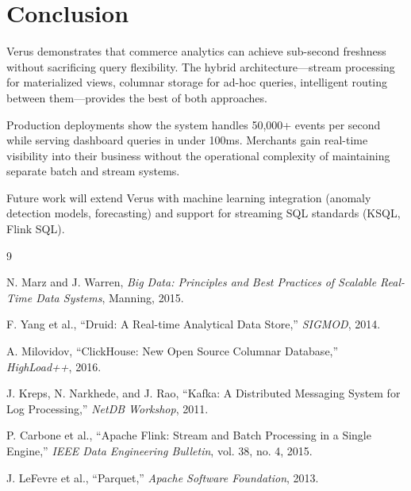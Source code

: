 \section{Conclusion}


Verus demonstrates that commerce analytics can achieve sub-second freshness without sacrificing query flexibility. The hybrid architecture—stream processing for materialized views, columnar storage for ad-hoc queries, intelligent routing between them—provides the best of both approaches.

Production deployments show the system handles 50,000+ events per second while serving dashboard queries in under 100ms. Merchants gain real-time visibility into their business without the operational complexity of maintaining separate batch and stream systems.

Future work will extend Verus with machine learning integration (anomaly detection models, forecasting) and support for streaming SQL standards (KSQL, Flink SQL).

\begin{thebibliography}{9}

N. Marz and J. Warren, \textit{Big Data: Principles and Best Practices of Scalable Real-Time Data Systems}, Manning, 2015.

F. Yang et al., ``Druid: A Real-time Analytical Data Store,'' \textit{SIGMOD}, 2014.

A. Milovidov, ``ClickHouse: New Open Source Columnar Database,'' \textit{HighLoad++}, 2016.

J. Kreps, N. Narkhede, and J. Rao, ``Kafka: A Distributed Messaging System for Log Processing,'' \textit{NetDB Workshop}, 2011.

P. Carbone et al., ``Apache Flink: Stream and Batch Processing in a Single Engine,'' \textit{IEEE Data Engineering Bulletin}, vol. 38, no. 4, 2015.

J. LeFevre et al., ``Parquet,'' \textit{Apache Software Foundation}, 2013.

\end{thebibliography}

